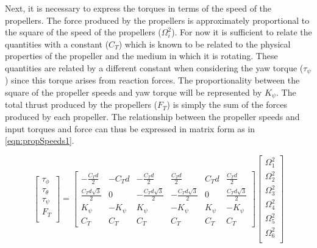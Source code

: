 Next, it is necessary to express the torques in terms of the speed of the propellers. The force produced by the propellers is approximately proportional to the square of the speed of the propellers (\(\Omega_{i}^{2}\)). For now it is sufficient to relate the quantities with a constant (\(C_{T}\)) which is known to be related to the physical properties of the propeller and the medium in which it is rotating. These quantities are related by a different constant when considering the yaw torque (\(\tau_{\psi}\)) since this torque arises from reaction forces. The proportionality between the square of the propeller speeds and yaw torque will be represented by \(K_{\psi}\). The total thrust produced by the propellers (\(F_{T}\)) is simply the sum of the forces produced by each propeller. The relationship between the propeller speeds and input torques and force can thus be expressed in matrix form as in \eqref{eqn:propSpeeds1}.

\begin{equation}\label{eqn:propSpeeds1}
\begin{bmatrix}
\tau_{\phi}\\
\tau_{\theta}\\
\tau_{\psi}\\
F_{T}\\
\end{bmatrix}
=
\begin{bmatrix}
-\frac{C_{T}d}{2} & -C_{T}d & -\frac{C_{T}d}{2} & \frac{C_{T}d}{2} & C_{T}d & \frac{C_{T}d}{2}\\
    \frac{C_{T}d\sqrt{3}}{2} & 0 & -\frac{C_{T}d\sqrt{3}}{2} & -\frac{C_{T}d\sqrt{3}}{2} & 0 & \frac{C_{T}d\sqrt{3}}{2}\\
    K_{\psi} & -K_{\psi} & K_{\psi} & -K_{\psi} & K_{\psi} & -K_{\psi}\\
    C_{T} & C_{T} & C_{T} & C_{T} & C_{T} & C_{T}
\end{bmatrix}
\begin{bmatrix}
\Omega^{2}_{1}\\
\Omega^{2}_{2}\\
\Omega^{2}_{3}\\
\Omega^{2}_{4}\\
\Omega^{2}_{5}\\
\Omega^{2}_{6}\\
\end{bmatrix}
\end{equation}

